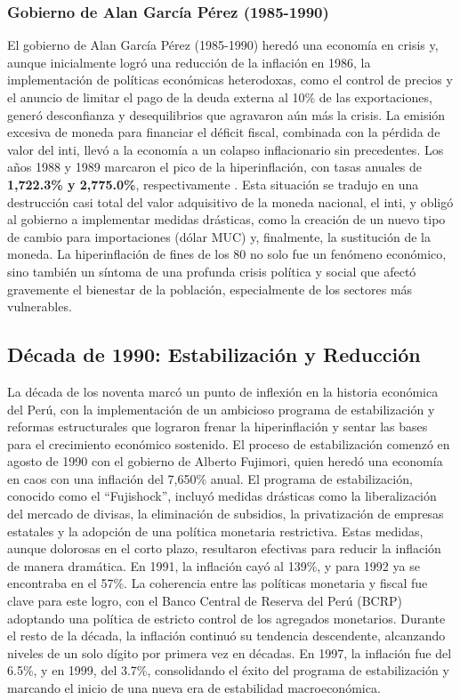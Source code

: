 \documentclass[
  stu,
  floatsintext,
  longtable,
  a4paper,
  nolmodern,
  notxfonts,
  notimes,
  12pt,
  colorlinks=true,linkcolor=blue,citecolor=blue,urlcolor=blue]{apa7}
\begin{document}
\subsubsection{Gobierno de Alan García Pérez
(1985-1990)}\label{gobierno-de-alan-garcuxeda-puxe9rez-1985-1990}

El gobierno de Alan García Pérez (1985-1990) heredó una economía en
crisis y, aunque inicialmente logró una reducción de la inflación en
1986, la implementación de políticas económicas heterodoxas, como el
control de precios y el anuncio de limitar el pago de la deuda externa
al 10\% de las exportaciones, generó desconfianza y desequilibrios que
agravaron aún más la crisis. La emisión excesiva de moneda para
financiar el déficit fiscal, combinada con la pérdida de valor del inti,
llevó a la economía a un colapso inflacionario sin precedentes. Los años
1988 y 1989 marcaron el pico de la hiperinflación, con tasas anuales de
\textbf{1,722.3\% y 2,775.0\%}, respectivamente . Esta situación se
tradujo en una destrucción casi total del valor adquisitivo de la moneda
nacional, el inti, y obligó al gobierno a implementar medidas drásticas,
como la creación de un nuevo tipo de cambio para importaciones (dólar
MUC) y, finalmente, la sustitución de la moneda. La hiperinflación de
fines de los 80 no solo fue un fenómeno económico, sino también un
síntoma de una profunda crisis política y social que afectó gravemente
el bienestar de la población, especialmente de los sectores más
vulnerables.

\subsection{Década de 1990: Estabilización y
Reducción}\label{duxe9cada-de-1990-estabilizaciuxf3n-y-reducciuxf3n}

La década de los noventa marcó un punto de inflexión en la historia
económica del Perú, con la implementación de un ambicioso programa de
estabilización y reformas estructurales que lograron frenar la
hiperinflación y sentar las bases para el crecimiento económico
sostenido. El proceso de estabilización comenzó en agosto de 1990 con el
gobierno de Alberto Fujimori, quien heredó una economía en caos con una
inflación del 7,650\% anual. El programa de estabilización, conocido
como el ``Fujishock'', incluyó medidas drásticas como la liberalización
del mercado de divisas, la eliminación de subsidios, la privatización de
empresas estatales y la adopción de una política monetaria restrictiva.
Estas medidas, aunque dolorosas en el corto plazo, resultaron efectivas
para reducir la inflación de manera dramática. En 1991, la inflación
cayó al 139\%, y para 1992 ya se encontraba en el 57\%. La coherencia
entre las políticas monetaria y fiscal fue clave para este logro, con el
Banco Central de Reserva del Perú (BCRP) adoptando una política de
estricto control de los agregados monetarios. Durante el resto de la
década, la inflación continuó su tendencia descendente, alcanzando
niveles de un solo dígito por primera vez en décadas. En 1997, la
inflación fue del 6.5\%, y en 1999, del 3.7\%, consolidando el éxito del
programa de estabilización y marcando el inicio de una nueva era de
estabilidad macroeconómica.
\end{document}
